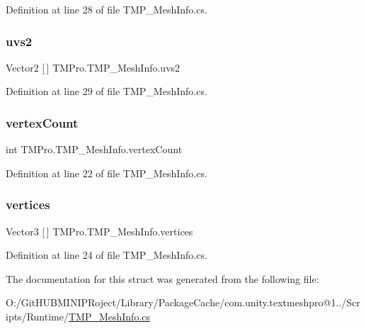 Definition at line 28 of file T\+M\+P\+\_\+\+Mesh\+Info.\+cs.

\mbox{\label{struct_t_m_pro_1_1_t_m_p___mesh_info_a2ea56e0aace99edfe971760bd76a890d}} 
\subsubsection{\texorpdfstring{uvs2}{uvs2}}
{\footnotesize\ttfamily Vector2 \mbox{[}$\,$\mbox{]} T\+M\+Pro.\+T\+M\+P\+\_\+\+Mesh\+Info.\+uvs2}



Definition at line 29 of file T\+M\+P\+\_\+\+Mesh\+Info.\+cs.

\mbox{\label{struct_t_m_pro_1_1_t_m_p___mesh_info_a6546f16eff9f1de656a8f75415934aea}} 
\subsubsection{\texorpdfstring{vertexCount}{vertexCount}}
{\footnotesize\ttfamily int T\+M\+Pro.\+T\+M\+P\+\_\+\+Mesh\+Info.\+vertex\+Count}



Definition at line 22 of file T\+M\+P\+\_\+\+Mesh\+Info.\+cs.

\mbox{\label{struct_t_m_pro_1_1_t_m_p___mesh_info_a7f31f8c5b18a9d84129a7f2cb5981728}} 
\subsubsection{\texorpdfstring{vertices}{vertices}}
{\footnotesize\ttfamily Vector3 \mbox{[}$\,$\mbox{]} T\+M\+Pro.\+T\+M\+P\+\_\+\+Mesh\+Info.\+vertices}



Definition at line 24 of file T\+M\+P\+\_\+\+Mesh\+Info.\+cs.



The documentation for this struct was generated from the following file\+:\begin{DoxyCompactItemize}
\item 
O\+:/\+Git\+H\+U\+B\+M\+I\+N\+I\+P\+Roject/\+Library/\+Package\+Cache/com.\+unity.\+textmeshpro@1../\+Scripts/\+Runtime/\mbox{\hyperlink{_t_m_p___mesh_info_8cs}{T\+M\+P\+\_\+\+Mesh\+Info.\+cs}}\end{DoxyCompactItemize}
